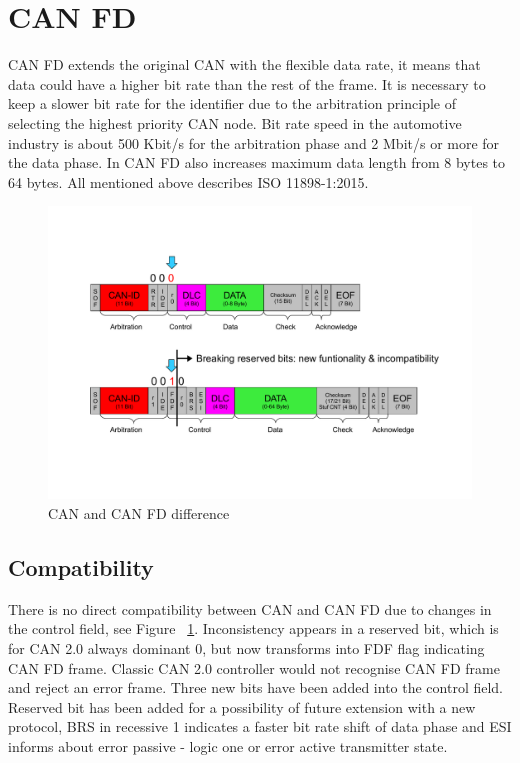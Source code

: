 \documentclass{ctuthesis}
\begin{document}
 \section{CAN FD}
  CAN FD extends the original CAN with the flexible data rate, it means that data could have a higher bit rate than the rest of the frame. It is necessary to keep a slower bit rate for the identifier due to the arbitration principle of selecting the highest priority CAN node\cite{priority_can}. Bit rate speed in the automotive industry is about 500 Kbit/s for the arbitration phase and 2 Mbit/s or more for the data phase\cite{canfd_calculator}. In CAN FD also increases maximum data length from 8 bytes to 64 bytes. All mentioned above describes ISO 11898-1:2015.
  \begin{figure}[H]
  \includegraphics[width=1\textwidth]{agl2017-socketcan-can_fd}
  \caption{CAN and CAN FD difference \cite{canfd}}
  \label{fig:cancanfddifference}
  \end{figure}
  \subsection{Compatibility}
  \label{section:combability}
   There is no direct compatibility between CAN and CAN FD due to changes in the control field, see Figure ~\ref{fig:cancanfddifference}. Inconsistency appears in a reserved bit, which is for CAN 2.0 always dominant 0, but now transforms into FDF flag indicating CAN FD frame. Classic CAN 2.0 controller would not recognise CAN FD frame and reject an error frame. Three new bits have been added into the control field. Reserved bit has been added for a possibility of future extension with a new protocol, BRS in recessive 1 indicates a faster bit rate shift of data phase and ESI informs about error passive - logic one or error active transmitter state.
\end{document}
